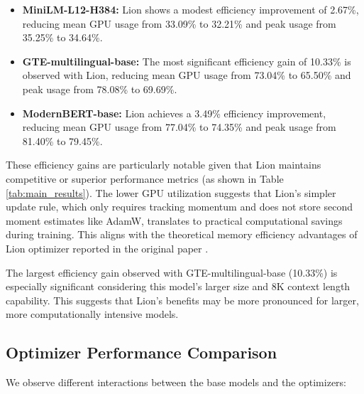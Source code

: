 \documentclass[conference]{IEEEtran}
\begin{document}
\begin{itemize}
    \item \textbf{MiniLM-L12-H384:} Lion shows a modest efficiency improvement of 2.67\%, reducing mean GPU usage from 33.09\% to 32.21\% and peak usage from 35.25\% to 34.64\%.
    \item \textbf{GTE-multilingual-base:} The most significant efficiency gain of 10.33\% is observed with Lion, reducing mean GPU usage from 73.04\% to 65.50\% and peak usage from 78.08\% to 69.69\%.
    \item \textbf{ModernBERT-base:} Lion achieves a 3.49\% efficiency improvement, reducing mean GPU usage from 77.04\% to 74.35\% and peak usage from 81.40\% to 79.45\%.
\end{itemize}

These efficiency gains are particularly notable given that Lion maintains competitive or superior performance metrics (as shown in Table \ref{tab:main_results}). The lower GPU utilization suggests that Lion's simpler update rule, which only requires tracking momentum and does not store second moment estimates like AdamW, translates to practical computational savings during training. This aligns with the theoretical memory efficiency advantages of Lion optimizer reported in the original paper \cite{chen2023symbolic}.

The largest efficiency gain observed with GTE-multilingual-base (10.33\%) is especially significant considering this model's larger size and 8K context length capability. This suggests that Lion's benefits may be more pronounced for larger, more computationally intensive models.

\subsection{Optimizer Performance Comparison}
We observe different interactions between the base models and the optimizers:
\end{document}
